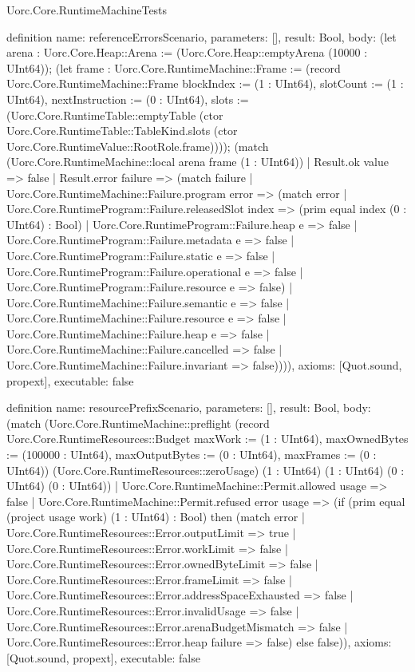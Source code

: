 \begin{lexlean}{Uorc.Core.RuntimeMachineTests}
\begin{semanticmodule}
definition{
  name: referenceErrorsScenario,
  parameters: [],
  result: Bool,
  body: (let arena : Uorc.Core.Heap::Arena := (Uorc.Core.Heap::emptyArena (10000 : UInt64)); (let frame : Uorc.Core.RuntimeMachine::Frame := (record Uorc.Core.RuntimeMachine::Frame {blockIndex := (1 : UInt64), slotCount := (1 : UInt64), nextInstruction := (0 : UInt64), slots := (Uorc.Core.RuntimeTable::emptyTable (ctor Uorc.Core.RuntimeTable::TableKind.slots (ctor Uorc.Core.RuntimeValue::RootRole.frame)))}); (match (Uorc.Core.RuntimeMachine::local arena frame (1 : UInt64))
    | Result.ok value => false
    | Result.error failure => (match failure
      | Uorc.Core.RuntimeMachine::Failure.program error => (match error
        | Uorc.Core.RuntimeProgram::Failure.releasedSlot index => (prim equal index (0 : UInt64) : Bool)
        | Uorc.Core.RuntimeProgram::Failure.heap e => false
        | Uorc.Core.RuntimeProgram::Failure.metadata e => false
        | Uorc.Core.RuntimeProgram::Failure.static e => false
        | Uorc.Core.RuntimeProgram::Failure.operational e => false
        | Uorc.Core.RuntimeProgram::Failure.resource e => false)
      | Uorc.Core.RuntimeMachine::Failure.semantic e => false
      | Uorc.Core.RuntimeMachine::Failure.resource e => false
      | Uorc.Core.RuntimeMachine::Failure.heap e => false
      | Uorc.Core.RuntimeMachine::Failure.cancelled => false
      | Uorc.Core.RuntimeMachine::Failure.invariant => false)))),
  axioms: [Quot.sound, propext],
  executable: false
}

definition{
  name: resourcePrefixScenario,
  parameters: [],
  result: Bool,
  body: (match (Uorc.Core.RuntimeMachine::preflight (record Uorc.Core.RuntimeResources::Budget {maxWork := (1 : UInt64), maxOwnedBytes := (100000 : UInt64), maxOutputBytes := (0 : UInt64), maxFrames := (0 : UInt64)}) (Uorc.Core.RuntimeResources::zeroUsage) (1 : UInt64) (1 : UInt64) (0 : UInt64) (0 : UInt64))
    | Uorc.Core.RuntimeMachine::Permit.allowed usage => false
    | Uorc.Core.RuntimeMachine::Permit.refused error usage => (if (prim equal (project usage work) (1 : UInt64) : Bool) then (match error
      | Uorc.Core.RuntimeResources::Error.outputLimit => true
      | Uorc.Core.RuntimeResources::Error.workLimit => false
      | Uorc.Core.RuntimeResources::Error.ownedByteLimit => false
      | Uorc.Core.RuntimeResources::Error.frameLimit => false
      | Uorc.Core.RuntimeResources::Error.addressSpaceExhausted => false
      | Uorc.Core.RuntimeResources::Error.invalidUsage => false
      | Uorc.Core.RuntimeResources::Error.arenaBudgetMismatch => false
      | Uorc.Core.RuntimeResources::Error.heap failure => false) else false)),
  axioms: [Quot.sound, propext],
  executable: false
}


\end{semanticmodule}
\end{lexlean}
